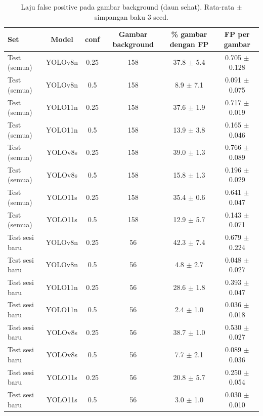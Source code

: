 \begin{table}[!t]
\centering
\caption{Laju false positive pada gambar background (daun sehat). Rata-rata $\pm$ simpangan baku 3 seed.}
\label{tab:fp_background}
\footnotesize
\begin{tabular}{lccccc}
\hline
\textbf{Set} & \textbf{Model} & \textbf{conf} & \textbf{Gambar background} & \textbf{\% gambar dengan FP} & \textbf{FP per gambar} \\
\hline
Test (semua) & YOLOv8n & 0.25 & 158 & 37.8 $\pm$ 5.4 & 0.705 $\pm$ 0.128 \\
Test (semua) & YOLOv8n & 0.5 & 158 & 8.9 $\pm$ 7.1 & 0.091 $\pm$ 0.075 \\
Test (semua) & YOLO11n & 0.25 & 158 & 37.6 $\pm$ 1.9 & 0.717 $\pm$ 0.019 \\
Test (semua) & YOLO11n & 0.5 & 158 & 13.9 $\pm$ 3.8 & 0.165 $\pm$ 0.046 \\
Test (semua) & YOLOv8s & 0.25 & 158 & 39.0 $\pm$ 1.3 & 0.766 $\pm$ 0.089 \\
Test (semua) & YOLOv8s & 0.5 & 158 & 15.8 $\pm$ 1.3 & 0.196 $\pm$ 0.029 \\
Test (semua) & YOLO11s & 0.25 & 158 & 35.4 $\pm$ 0.6 & 0.641 $\pm$ 0.047 \\
Test (semua) & YOLO11s & 0.5 & 158 & 12.9 $\pm$ 5.7 & 0.143 $\pm$ 0.071 \\
Test sesi baru & YOLOv8n & 0.25 & 56 & 42.3 $\pm$ 7.4 & 0.679 $\pm$ 0.224 \\
Test sesi baru & YOLOv8n & 0.5 & 56 & 4.8 $\pm$ 2.7 & 0.048 $\pm$ 0.027 \\
Test sesi baru & YOLO11n & 0.25 & 56 & 28.6 $\pm$ 1.8 & 0.393 $\pm$ 0.047 \\
Test sesi baru & YOLO11n & 0.5 & 56 & 2.4 $\pm$ 1.0 & 0.036 $\pm$ 0.018 \\
Test sesi baru & YOLOv8s & 0.25 & 56 & 38.7 $\pm$ 1.0 & 0.530 $\pm$ 0.027 \\
Test sesi baru & YOLOv8s & 0.5 & 56 & 7.7 $\pm$ 2.1 & 0.089 $\pm$ 0.036 \\
Test sesi baru & YOLO11s & 0.25 & 56 & 20.8 $\pm$ 5.7 & 0.250 $\pm$ 0.054 \\
Test sesi baru & YOLO11s & 0.5 & 56 & 3.0 $\pm$ 1.0 & 0.030 $\pm$ 0.010 \\
\hline
\end{tabular}
\end{table}
